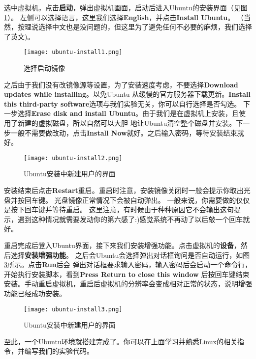 选中虚拟机，点击\textbf{启动}，弹出虚拟机画面，启动后进入Ubuntu的安装界面（见图\ref{fig:ubuntu-install1}）。
左侧可以选择语言，这里我们选择\textbf{English}，并点击\textbf{Install Ubuntu}。
（当然，按理说选择中文也是没问题的，但这里为了避免任何不必要的麻烦，我们选择了英文)。

\begin{figure}[htbp]
  \centering
  \texttt{[image: ubuntu-install1.png]}
  \caption{选择启动镜像}\label{fig:ubuntu-install1}
\end{figure}

之后由于我们没有改镜像源等设置，为了安装速度考虑，不要选择\textbf{Download updates while installing}。以免Ubuntu
从缓慢的官方服务器下载更新。\textbf{Install this third-party software}选项与我们实验无关，你可以自行选择是否勾选。
下一步选择\textbf{Erase disk and install Ubuntu}。由于我们是在虚拟机上安装，且使用了新建的虚拟磁盘，所以自然可以大胆
地让Ubuntu清空整个磁盘并安装。下一步一般不需要做改动，点击\textbf{Install Now}就好。之后输入密码，等待安装结束就好。

\begin{figure}[htbp]
  \centering
  \texttt{[image: ubuntu-install2.png]}
  \caption{Ubuntu安装中新建用户的界面}\label{fig:ubuntu-install2} 
\end{figure}

安装结束后点击\textbf{Restart}重启。重启时注意，安装镜像关闭时一般会提示你取出光盘并按回车键。
光盘镜像正常情况下会被自动弹出。
一般来说，你需要做的仅仅是按下回车键并等待重启。
这里注意，有时候由于种种原因它不会输出这句提示，遇到这种情况就需要发动你的第六感了:)感觉系统不再动了以后敲一个回车就好。

重启完成后登入Ubuntu界面，接下来我们安装增强功能。点击虚拟机的\textbf{设备}，然后选择\textbf{安装增强功能}。
之后会Ubuntu会选择弹出对话框询问是否自动运行，如图\ref{fig:ubuntu-install3}所示。点击\textbf{Run}后会
弹出对话框要求输入密码，输入密码后会启动一个命令行，开始执行安装脚本，看到\textbf{Press Return to close this window}
后按回车键结束安装。手动重启虚拟机，重启后虚拟机的分辨率会变成相对正常的状态，说明增强功能已经成功安装。

\begin{figure}[htbp]
  \centering
  \texttt{[image: ubuntu-install3.png]}
  \caption{Ubuntu安装中新建用户的界面}\label{fig:ubuntu-install3} 
\end{figure}

至此，一个Ubuntu环境就搭建完成了。你可以在上面学习并熟悉Linux的相关指令，并编写我们的实验代码。


